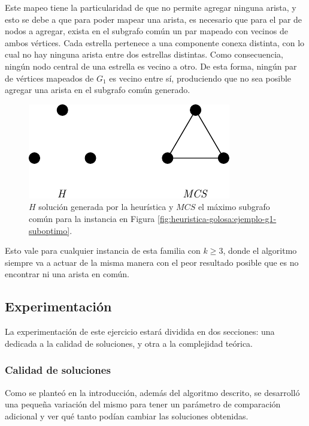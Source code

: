 Este mapeo tiene la particularidad de que no permite agregar ninguna arista, y
esto se debe a que para poder mapear una arista, es necesario que para el par de
nodos a agregar, exista en el subgrafo común un par mapeado con vecinos de ambos
vértices. Cada estrella pertenece a una componente conexa distinta, con lo cual
no hay ninguna arista entre dos estrellas distintas. Como consecuencia, ningún
nodo central de una estrella es vecino a otro. De esta forma, ningún par de
vértices mapeados de $G_1$ es vecino entre sí, produciendo que no sea posible
agregar una arista en el subgrafo común generado.

\begin{figure}[H]
	\centering
	\includegraphics{imagenes/ex4_solution.pdf}
	\caption{$H$ solución generada por la heurística y $MCS$ el máximo subgrafo
	común para la instancia en Figura \ref{fig:heuristica-golosa:ejemplo-g1-suboptimo}.}
	\label{fig:heuristica-golosa:ejemplo-g1-suboptimo-solucion}
\end{figure}

Esto vale para cualquier instancia de esta familia con $k \geq 3$, donde el
algoritmo siempre va a actuar de la misma manera con el peor resultado posible
que es no encontrar ni una arista en común.

\subsection{Experimentación}

La experimentación de este ejercicio estará dividida en dos secciones: una
dedicada a la calidad de soluciones, y otra a la complejidad teórica.

\subsubsection{Calidad de soluciones}

Como se planteó en la introducción, además del algoritmo descrito, se desarrolló
una pequeña variación del mismo para tener un parámetro de comparación adicional
y ver qué tanto podían cambiar las soluciones obtenidas.

